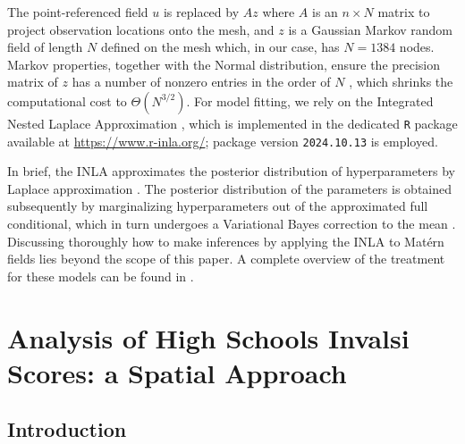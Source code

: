 \documentclass{book}
\begin{document}
\begin{appendices}
The point-referenced field $u$ is replaced by $A z$ where $A$ is an $n \times N$ matrix to project observation locations onto the mesh, and $z$ is a Gaussian Markov random field of length $N$ defined on the mesh which, in our case, has $N = 1384$ nodes. Markov properties, together with the Normal distribution, ensure the precision matrix of $z$ has a number of nonzero entries in the order of $N$ \citep{GMRFs}, which shrinks the computational cost to $\Theta(N^{3/2})$. For model fitting, we rely on the Integrated Nested Laplace Approximation \citep[INLA][]{INLA}, which is implemented in the dedicated \texttt{R} package available at \url{https://www.r-inla.org/}; package version \texttt{2024.10.13} is employed.


 

In brief, %
the INLA approximates the posterior distribution of hyperparameters by Laplace approximation \citep{INLA}. The posterior distribution of the parameters is obtained subsequently by marginalizing hyperparameters out of the approximated full conditional, which in turn undergoes a Variational Bayes correction to the mean \citep{INLAVB}. Discussing thoroughly how to make inferences by applying the INLA to Matérn fields lies beyond the scope of this paper. A complete overview of the treatment for these models can be found in \cite{INLASPDE}.


\end{appendices}

 \label{chapter:SchoolDataIT}

\chapter{Analysis of High Schools Invalsi Scores: a Spatial Approach}

\section{Introduction}

\end{document}
